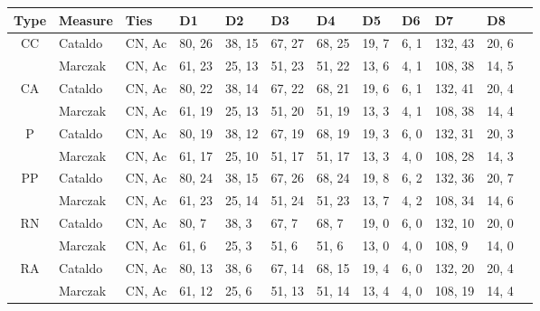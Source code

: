 \begin{tabularx}{\textwidth}{|c|X|X|X|X|X|X|X|X|X|X|X|}
\hline
Type & Measure & Ties & D1 & D2 & D3 & D4 & D5 & D6 & D7 & D8
\\\hline 
CC   & Cataldo & CN, Ac & 80, 26 & 38, 15 & 67, 27 & 68, 25 & 19, 7 & 6, 1
& 132, 43 & 20, 6\\ 
& Marczak & CN, Ac & 61, 23 & 25, 13 & 51, 23 & 51, 22 & 13, 6 & 4, 1
& 108, 38 & 14, 5\\ 
\hline

CA   & Cataldo & CN, Ac & 80, 22 & 38, 14 & 67, 22 & 68, 21 & 19, 6 & 6, 1
& 132, 41 & 20, 4\\ 
& Marczak & CN, Ac & 61, 19 & 25, 13 & 51, 20 & 51, 19 & 13, 3 & 4, 1
& 108, 38 & 14, 4\\ 
\hline

P   & Cataldo & CN, Ac & 80, 19 & 38, 12 & 67, 19 & 68, 19 & 19, 3 & 6, 0
& 132, 31 & 20, 3\\ 
& Marczak & CN, Ac & 61, 17 & 25, 10 & 51, 17 & 51, 17 & 13, 3 & 4, 0
& 108, 28 & 14, 3\\ 
\hline

PP   & Cataldo & CN, Ac & 80, 24 & 38, 15 & 67, 26 & 68, 24 & 19, 8 & 6, 2
& 132, 36 & 20, 7\\ 
& Marczak & CN, Ac & 61, 23 & 25, 14 & 51, 24 & 51, 23 & 13, 7 & 4, 2
& 108, 34 & 14, 6\\ 
\hline

RN   & Cataldo & CN, Ac & 80, 7 & 38, 3 & 67, 7 & 68, 7 & 19, 0 & 6, 0
& 132, 10 & 20, 0\\ 
& Marczak & CN, Ac & 61, 6 & 25, 3 & 51, 6 & 51, 6 & 13, 0 & 4, 0
& 108, 9 & 14, 0\\ 
\hline

RA   & Cataldo & CN, Ac & 80, 13 & 38, 6 & 67, 14 & 68, 15 & 19, 4 & 6, 0
& 132, 20 & 20, 4\\ 
& Marczak & CN, Ac & 61, 12 & 25, 6 & 51, 13 & 51, 14 & 13, 4 & 4, 0
& 108, 19 & 14, 4\\ 
\hline
\end{tabularx}